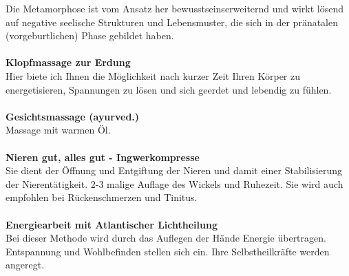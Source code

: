\documentclass[10pt,foldmark,notumble]{leaflet}
\begin{document}
Die Metamorphose ist vom Ansatz her bewusstseins\-erweiternd und wirkt lösend auf negative seelische Strukturen und Lebensmuster, die sich in der pränatalen (vorgeburtlichen) Phase gebildet haben.\\
\\
{\large \bf Klopfmassage zur Erdung }\\
Hier biete ich Ihnen die Möglichkeit nach kurzer Zeit Ihren Körper zu energetisieren, Spannungen zu lösen und sich geerdet und lebendig zu fühlen. \\
\\
{\large \bf Gesichtsmassage (ayurved.)}\\
Massage mit warmen Öl.\\
\\
{\large \bf Nieren gut, alles gut - Ingwerkompresse}\\
Sie dient der Öffnung und Entgiftung der Nieren und damit einer Stabilisierung der Nierentätigkeit. 2-3 malige Auflage des Wickels und Ruhezeit. Sie wird auch empfohlen bei Rückenschmerzen und Tinitus.\\
\\
{\large \bf Energiearbeit mit Atlantischer Lichtheilung}\\
Bei dieser Methode wird durch das Auflegen der Hände Energie übertragen. Entspannung und Wohlbefinden stellen sich ein. Ihre Selbstheilkräfte werden angeregt. 

\end{document}

